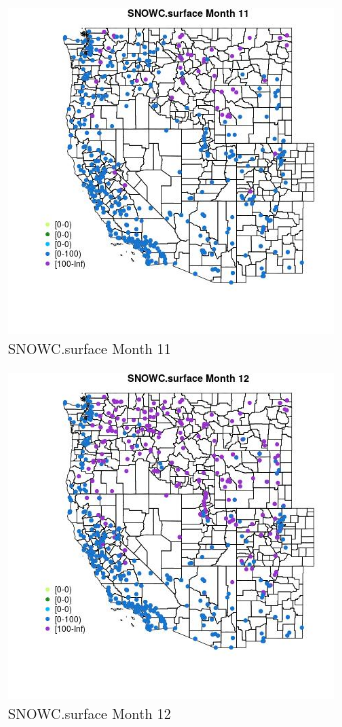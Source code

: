 \begin{figure} 
\centering  
\includegraphics[width=0.77\textwidth]{Code_Outputs/Report_ML_input_PM25_Step4_part_e_de_duplicated_aves_compiled_2019-05-14wNAs_MapObsMo11SNOWCsurface.jpg} 
\caption{\label{fig:Report_ML_input_PM25_Step4_part_e_de_duplicated_aves_compiled_2019-05-14wNAsMapObsMo11SNOWCsurface}SNOWC.surface Month 11} 
\end{figure} 
 

\begin{figure} 
\centering  
\includegraphics[width=0.77\textwidth]{Code_Outputs/Report_ML_input_PM25_Step4_part_e_de_duplicated_aves_compiled_2019-05-14wNAs_MapObsMo12SNOWCsurface.jpg} 
\caption{\label{fig:Report_ML_input_PM25_Step4_part_e_de_duplicated_aves_compiled_2019-05-14wNAsMapObsMo12SNOWCsurface}SNOWC.surface Month 12} 
\end{figure} 
 

